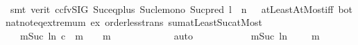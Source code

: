 \begin{isabellebody}
\ \ \ \ \ \ \ \ \isamarkupfalse%
\ {\isacharparenleft}{\kern0pt}smt\ {\isacharparenleft}{\kern0pt}verit{\isacharcomma}{\kern0pt}\ ccfv{\isacharunderscore}{\kern0pt}SIG{\isacharparenright}{\kern0pt}\ Suc{\isacharunderscore}{\kern0pt}eq{\isacharunderscore}{\kern0pt}plus{}\ Suc{\isacharunderscore}{\kern0pt}le{\isacharunderscore}{\kern0pt}mono\ Suc{\isacharunderscore}{\kern0pt}pred{\isacharprime}{\kern0pt}\ {\isacartoucheopen}l\ {\isasymin}\ {\isacharbraceleft}{\kern0pt}{}{\isachardot}{\kern0pt}{\isachardot}{\kern0pt}n\ {\isacharminus}{\kern0pt}\ {}{\isacharbraceright}{\kern0pt}{\isacartoucheclose}\ atLeastAtMost{\isacharunderscore}{\kern0pt}iff\ bot{\isacharunderscore}{\kern0pt}nat{\isacharunderscore}{\kern0pt}{}{\isachardot}{\kern0pt}not{\isacharunderscore}{\kern0pt}eq{\isacharunderscore}{\kern0pt}extremum\ ex\ order{\isacharunderscore}{\kern0pt}less{\isacharunderscore}{\kern0pt}trans\ sum{\isachardot}{\kern0pt}atLeast{\isacharunderscore}{\kern0pt}Suc{\isacharunderscore}{\kern0pt}atMost{\isacharparenright}{\kern0pt}\isanewline
\ \ \ \ \ \ \isamarkupfalse%
\ \isamarkupfalse%
\ {\isachardoublequoteopen}{\isachardot}{\kern0pt}{\isachardot}{\kern0pt}{\isachardot}{\kern0pt}\ {\isacharequal}{\kern0pt}\ {\isacharparenleft}{\kern0pt}{\isasymSum}m{\isasymin}{\isacharbraceleft}{\kern0pt}Suc\ {\isacharparenleft}{\kern0pt}l{\isacharplus}{\kern0pt}{}{\isacharparenright}{\kern0pt}{\isachardot}{\kern0pt}{\isachardot}{\kern0pt}n{\isacharbraceright}{\kern0pt}{\isachardot}{\kern0pt}\ {\isacharparenleft}{\kern0pt}c\ {\isacharbang}{\kern0pt}\ {\isacharparenleft}{\kern0pt}m{\isacharminus}{\kern0pt}{}{\isacharparenright}{\kern0pt}{\isacharparenright}{\kern0pt}\ {\isacharslash}{\kern0pt}\ {}\ {\isacharcircum}{\kern0pt}\ m{\isacharparenright}{\kern0pt}{\isachardoublequoteclose}\isanewline
\ \ \ \ \ \ \ \ \isamarkupfalse%
\ {}\ \isamarkupfalse%
\ auto\isanewline
\ \ \ \ \ \ \isamarkupfalse%
\ \isamarkupfalse%
\ {\isachardoublequoteopen}{\isachardot}{\kern0pt}{\isachardot}{\kern0pt}{\isachardot}{\kern0pt}\ {\isasymle}\ {\isacharparenleft}{\kern0pt}{\isasymSum}m{\isasymin}{\isacharbraceleft}{\kern0pt}Suc\ {\isacharparenleft}{\kern0pt}l{\isacharplus}{\kern0pt}{}{\isacharparenright}{\kern0pt}{\isachardot}{\kern0pt}{\isachardot}{\kern0pt}n{\isacharbraceright}{\kern0pt}{\isachardot}{\kern0pt}\ {}\ {\isacharslash}{\kern0pt}\ {}\ {\isacharcircum}{\kern0pt}\ m{\isacharparenright}{\kern0pt}{\isachardoublequoteclose}\isanewline

\end{isabellebody}
